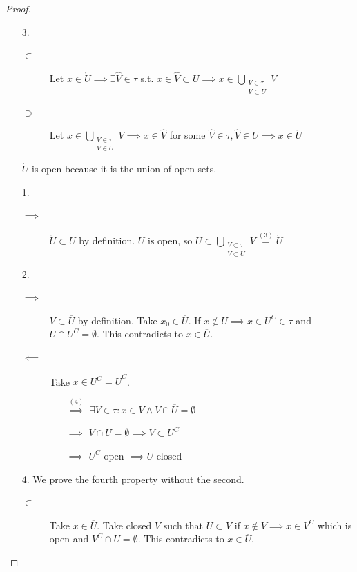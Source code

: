 \documentclass[a4paper]{article}
\numberwithin{lecref}{section}
\begin{document}
\begin{proof}
	\begin{enumerate}
		\item[3.]
		  \begin{description}
		  	\item[$\subset$] Let $x \in \mathring U \implies \exists \hat V \in \tau$ s.t. $x \in \hat V \subset U \implies x \in \bigcup_{\substack{V \in \tau \\ V \subset U}} V$
		  	\item[$\supset$] Let $x \in \bigcup_{\substack{V \in \tau \\ V \in U}} V \implies x \in \hat V$ for some $\hat V \in \tau, \hat V \in U \implies x \in \mathring U$
		  \end{description}
		  $\mathring U$ is open because it is the union of open sets.
		\item[1.]
			\begin{description}
				\item[$\implies$]
					$\mathring U \subset U$ by definition.
					$U$ is open, so $U \subset \bigcup_{\substack{V \subset \tau \\ V \subset U}} V \overset{(3)}{=} \mathring U$
			\end{description}
		\item[2.]
			\begin{description}
				\item[$\implies$]
					$V \subset \overline{U}$ by definition.
					Take $x_0 \in \overline U$. If $x \not\in U \implies x \in U^C \in \tau$ and $U \cap U^C = \emptyset$. This contradicts to $x \in \overline U$.
				\item[$\impliedby$]
					Take $x \in U^C = \overline U^C$.
					\begin{itemize}
						\item[$\overset{(4)}{\implies}$] $\exists V \in \tau: x \in V \land V \cap \overline U = \emptyset$
						\item[$\implies$] $V \cap U = \emptyset \implies V \subset U^C$
						\item[$\implies$] $U^C$ open $\implies U$ closed
					\end{itemize}
			\end{description}
		\item[4.]
			We prove the fourth property without the second.
			\begin{description}
				\item[$\subset$]
					Take $x \in \overline{U}$. Take closed $V$ such that $U \subset V$ if $x \not\in V \implies x \in V^C$ which is open and $V^C \cap U = \emptyset$. This contradicts to $x \in \overline U$.

\end{description}
\end{enumerate}
\end{proof}
\end{document}
